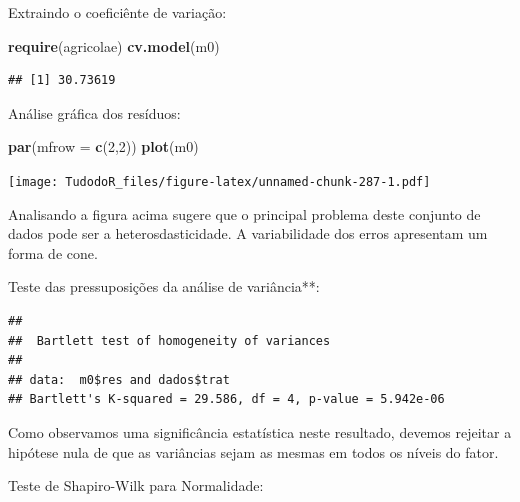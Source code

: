 \documentclass[
]{book}
\newenvironment{Shaded}{\begin{snugshade}}{\end{snugshade}}
\newcommand{\CommentTok}[1]{\textcolor[rgb]{0.56,0.35,0.01}{\textit{#1}}}
\newcommand{\DataTypeTok}[1]{\textcolor[rgb]{0.13,0.29,0.53}{#1}}
\newcommand{\DecValTok}[1]{\textcolor[rgb]{0.00,0.00,0.81}{#1}}
\newcommand{\KeywordTok}[1]{\textcolor[rgb]{0.13,0.29,0.53}{\textbf{#1}}}
\newcommand{\NormalTok}[1]{#1}
\newcommand{\OperatorTok}[1]{\textcolor[rgb]{0.81,0.36,0.00}{\textbf{#1}}}
\begin{document}
Extraindo o coeficiênte de variação:

\begin{Shaded}
\begin{Highlighting}[]
\KeywordTok{require}\NormalTok{(agricolae)}
\KeywordTok{cv.model}\NormalTok{(m0)}
\end{Highlighting}
\end{Shaded}

\begin{verbatim}
## [1] 30.73619
\end{verbatim}

Análise gráfica dos resíduos:

\begin{Shaded}
\begin{Highlighting}[]
\KeywordTok{par}\NormalTok{(}\DataTypeTok{mfrow =} \KeywordTok{c}\NormalTok{(}\DecValTok{2}\NormalTok{,}\DecValTok{2}\NormalTok{))}
\KeywordTok{plot}\NormalTok{(m0)}
\end{Highlighting}
\end{Shaded}

\texttt{[image: TudodoR\_files/figure-latex/unnamed-chunk-287-1.pdf]}

Analisando a figura acima sugere que o principal problema deste conjunto de dados pode ser a heterosdasticidade. A variabilidade dos erros apresentam um forma de cone.

Teste das pressuposições da análise de variância**:

\begin{Shaded}
\end{Shaded}

\begin{verbatim}
## 
##  Bartlett test of homogeneity of variances
## 
## data:  m0$res and dados$trat
## Bartlett's K-squared = 29.586, df = 4, p-value = 5.942e-06
\end{verbatim}

Como observamos uma significância estatística neste resultado, devemos rejeitar a hipótese nula de que as variâncias sejam as mesmas em todos os níveis do fator.

Teste de Shapiro-Wilk para Normalidade:

\begin{Shaded}
\end{Shaded}
\end{document}
